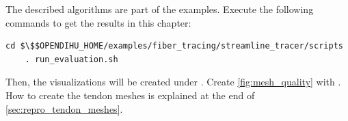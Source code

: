 \begin{reproduce_no_break}
  The described algorithms are part of the  examples. Execute the following commands to get the results in this chapter:
  \begin{lstlisting}[columns=fullflexible,breaklines=true,postbreak=\mbox{\textcolor{gray}{$\hookrightarrow$}\space}]
    cd $\$$OPENDIHU_HOME/examples/fiber_tracing/streamline_tracer/scripts
    . run_evaluation.sh
  \end{lstlisting}
  Then, the visualizations will be created under . Create \cref{fig:mesh_quality} with .
  How to create the tendon meshes is explained at the end of \cref{sec:repro_tendon_meshes}.
\end{reproduce_no_break}

